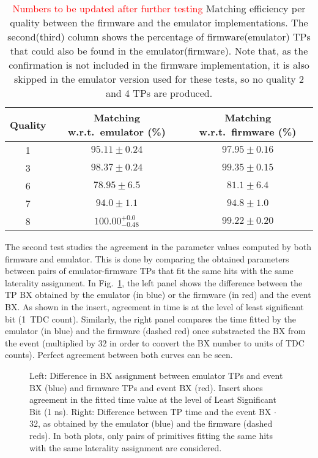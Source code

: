 \documentclass[../main.tex]{subfiles}
\begin{document}
\begin{table}[h!]
\begin{center}
\begin{tabular}{c | c | c}
Quality & Matching w.r.t.~emulator (\%) & Matching w.r.t.~firmware (\%) \\\hline
1 & $95.11 \pm 0.24$ & $97.95 \pm 0.16$ \\
3 & $98.37 \pm 0.24$ & $99.35 \pm 0.15$ \\ 
6 & $78.95 \pm 6.5$  & $81.1 \pm 6.4$   \\
7 & $94.0 \pm 1.1$   & $94.8 \pm 1.0$   \\
8 & $100.00 ^{+0.0}_{-0.48}$ & $99.22 \pm 0.20$
\end{tabular}
\caption{\textcolor{red}{Numbers to be updated after further testing} Matching efficiency per quality between the firmware and the emulator implementations. The second(third) column shows the percentage of firmware(emulator) TPs that could also be found in the emulator(firmware). Note that, as the confirmation is not included in the firmware implementation, it is also skipped in the emulator version used for these tests, so no quality 2 and 4 TPs are produced.}
\label{dts:tab:fwemu}
\end{center}
\end{table}

The second test studies the agreement in the parameter values computed by both firmware and emulator. This is done by comparing the obtained parameters between pairs of emulator-firmware TPs that fit the same hits with the same laterality assignment. In Fig.~\ref{dts:fig:fwemu_time}, the left panel shows the difference between the TP BX obtained by the emulator (in blue) or the firmware (in red) and the event BX. As shown in the insert, agreement in time is at the level of least significant bit (1~TDC count). Similarly, the right panel compares the time fitted by the emulator (in blue) and the firmware (dashed red) once substracted the BX from the event (multiplied by 32 in order to convert the BX number to units of TDC counts). Perfect agreement between both curves can be seen.


\begin{figure}[h!]
\begin{center}
\end{center}
\caption{Left: Difference in BX assignment between emulator TPs and event BX (blue) and firmware TPs and event BX (red). Insert shoes agreement in the fitted time value at the level of Least Significant Bit (1 ns). Right: Difference between TP time and the event BX $\cdot$ 32, as obtained by the emulator (blue) and the firmware (dashed reds). In both plots, only pairs of primitives fitting the same hits with the same laterality assignment are considered.}
\label{dts:fig:fwemu_time}
\end{figure}
\end{document}
